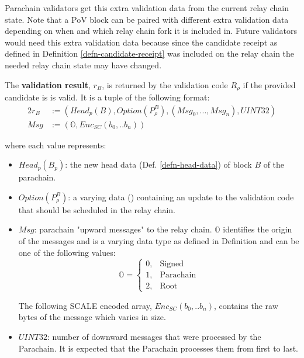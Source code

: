 \begin{definition}
  Parachain validators get this extra validation data from the current relay
  chain state. Note that a PoV block can be paired with different extra
  validation data depending on when and which relay chain fork it is included
  in. Future validators would need this extra validation data because since the
  candidate receipt as defined in Definition \ref{defn-candidate-receipt} was
  included on the relay chain the needed relay chain state may have changed.
\end{definition}

\begin{definition}
  The \textbf{validation result}, $r_B$, is returned by the validation code $R_{\rho}$
  if the provided candidate is is valid. It is a tuple of the following format:
  \begin{alignat*}{2}
    r_B &:= (Head_p(B), Option(P^B_{\rho}), (Msg_0, ..., Msg_n), UINT32) \\
    Msg &:= (\mathbb{O}, Enc_{SC}(b_0,.. b_n))
  \end{alignat*}

  where each value represents:
  \begin{itemize}
    \item $Head_p(B_p)$: the new head data (Def. \ref{defn-head-data}) of
    block $B$ of the parachain.
    \item $Option(P^B_{\rho})$: a varying data () containing an update
    to the validation code that should be scheduled in the relay chain.
    \item $Msg$: parachain "upward messages" to the relay chain. $\mathbb{O}$ identifies
    the origin of the messages and is a varying data type as defined in
    Definition  and can be one of the following values:
    \begin{equation*}
      \mathbb{O} =
      \begin{cases}
        0, & \text{Signed} \\
        1, & \text{Parachain} \\
        2, & \text{Root}
      \end{cases}
    \end{equation*}

    The following SCALE encoded array, $Enc_{SC}(b_0,.. b_n)$, contains the
    raw bytes of the message which varies in size.
    \item $UINT32$: number of downward messages that were processed by the Parachain. It
    is expected that the Parachain processes them from first to last.
  \end{itemize}
\end{definition}

